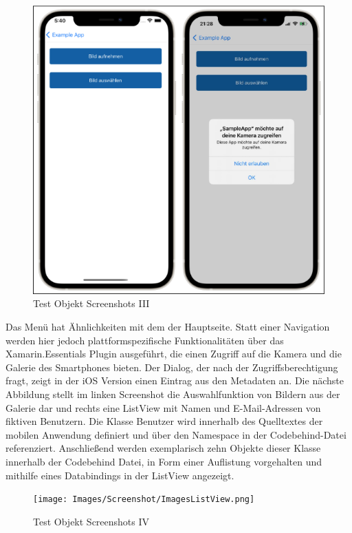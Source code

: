  
\begin{figure}[!ht]
 \includegraphics[width=\textwidth,keepaspectratio]{Images/Screenshot/Permissions.png}
 \caption{Test Objekt Screenshots III}
 \label{fig:TestObjectIII}
\end{figure}
Das Menü hat Ähnlichkeiten mit dem der Hauptseite.  Statt einer Navigation werden hier jedoch plattformspezifische Funktionalitäten über das Xamarin.Essentials Plugin ausgeführt, die einen Zugriff auf die Kamera und die Galerie des Smartphones bieten.  Der Dialog,  der nach der Zugriffsberechtigung fragt, zeigt in der iOS Version einen Eintrag aus den Metadaten an.
Die nächste Abbildung stellt im linken Screenshot die Auswahlfunktion von Bildern aus der Galerie dar und rechts eine ListView mit Namen und E-Mail-Adressen von fiktiven Benutzern.  
Die Klasse \glq Benutzer\grq{} wird innerhalb des Quelltextes der mobilen Anwendung definiert und über den Namespace in der Codebehind-Datei referenziert.  Anschließend werden exemplarisch zehn Objekte dieser Klasse innerhalb der Codebehind Datei,  in Form einer Auflistung vorgehalten und mithilfe eines Databindings in der ListView angezeigt. 
 
\begin{figure}[!ht]
 \texttt{[image: Images/Screenshot/ImagesListView.png]}
 \caption{Test Objekt Screenshots IV}
 \label{fig:TestObjectIV}
\end{figure}


